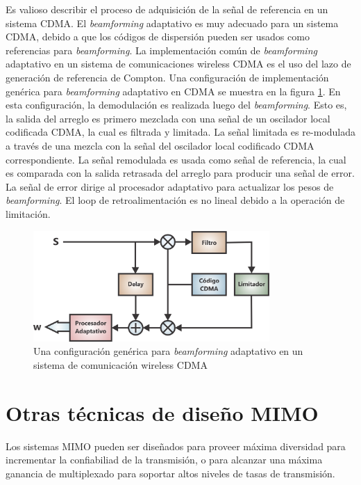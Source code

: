 Es valioso describir el proceso de adquisición de la señal de referencia en un sistema CDMA. El \textit{beamforming} adaptativo es muy adecuado para un sistema CDMA, debido a que los códigos de dispersión pueden ser usados como referencias para \textit{beamforming}. La implementación común de \textit{beamforming} adaptativo en un sistema de comunicaciones wireless CDMA es el uso del lazo de generación de referencia de Compton. Una configuración de implementación genérica para \textit{beamforming} adaptativo en CDMA se muestra en la figura \ref{fig:reference_signal_flow}. En esta configuración, la demodulación es realizada luego del \textit{beamforming}. Esto es, la salida del arreglo es primero mezclada con una señal de un oscilador local codificada CDMA, la cual es filtrada y limitada. La señal limitada es re-modulada a través de una mezcla con la señal del oscilador local codificado CDMA correspondiente.  La señal remodulada es usada como señal de referencia, la cual es comparada con la salida retrasada del arreglo para producir una señal de error. La señal de error dirige al procesador adaptativo para actualizar los pesos de \textit{beamforming}. El loop de retroalimentación es no lineal debido a la operación de limitación.

\begin{figure}[htb!]
        \centering
        \includegraphics[width=9cm]{./figures/C02-reference_signal_flow}
        \caption{Una configuración genérica para \textit{beamforming} adaptativo en un sistema de comunicación wireless CDMA}
        \label{fig:reference_signal_flow}
\end{figure}

\section{Otras técnicas de diseño MIMO}

Los sistemas MIMO pueden ser diseñados para proveer máxima diversidad para incrementar la confiabiliad de la transmisión, o para alcanzar una máxima ganancia de multiplexado para soportar altos niveles de tasas de transmisión.


